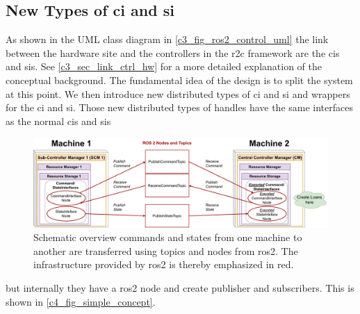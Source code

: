 \subsection{New Types of \gls{ci} and \gls{si}}\label{c4_sec_adaption_of_handles}
As shown in the UML class diagram in \autoref{c3_fig_ros2_control_uml} the link between the hardware site and the controllers in the \gls{r2c} framework are the \glspl{ci} and \glspl{si}. See \autoref{c3_sec_link_ctrl_hw} for a more detailed explanation of the conceptual background. \newline
The fundamental idea of the design is to split the system at this point. We then introduce new distributed types of \gls{ci} and \gls{si} and wrappers for the \gls{ci} and \gls{si}. Those new distributed types of handles have the same interfaces as the normal \glspl{ci} and \glspl{si} 
\begin{figure}[htbp]
	\centering
    \includegraphics[width=1\textwidth]{Figures/C4/simple_concept.drawio.pdf}
	\caption{Schematic overview commands and states from one machine to another are transferred using topics and nodes from \gls{ros2}. The infrastructure provided by \gls{ros2} is thereby emphasized in red.}
	\label{c4_fig_simple_concept}
\end{figure}
but internally they have a \gls{ros2} node and create publisher and subscribers. This is shown in \autoref{c4_fig_simple_concept}. \newline
